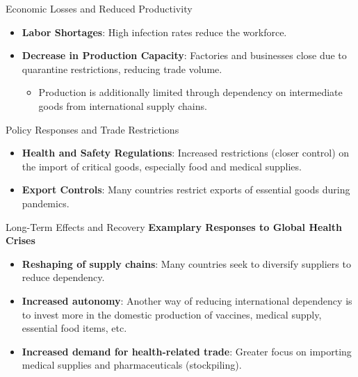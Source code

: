 \documentclass{beamer}
\begin{document}
\begin{frame}{Economic Losses and Reduced Productivity}
    \begin{itemize}
        \item \textbf{Labor Shortages}: High infection rates reduce the workforce.
        \item \textbf{Decrease in Production Capacity}: Factories and businesses close due to quarantine restrictions, reducing trade volume.
        \begin{itemize}
            \item Production is additionally limited through dependency on intermediate goods from international supply chains.
        \end{itemize}
    \end{itemize}
\end{frame}

\begin{frame}{Policy Responses and Trade Restrictions}
    \begin{itemize}
        \item \textbf{Health and Safety Regulations}: Increased restrictions (closer control) on the import of critical goods, especially food and medical supplies.
        \item \textbf{Export Controls}: Many countries restrict exports of essential goods during pandemics.
    \end{itemize}
\end{frame}

\begin{frame}{Long-Term Effects and Recovery}
\textbf{Examplary Responses to Global Health Crises}
    \begin{itemize}
        \item \textbf{Reshaping of supply chains}: Many countries seek to diversify suppliers to reduce dependency.
        \item \textbf{Increased autonomy}: Another way of reducing international dependency is to invest more in the domestic production of vaccines, medical supply, essential food items, etc.
         \item \textbf{Increased demand for health-related trade}: Greater focus on importing medical supplies and pharmaceuticals (stockpiling).
    \end{itemize}
\end{frame}
\end{document}
